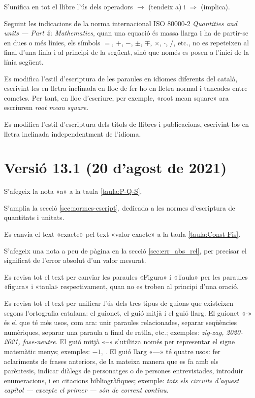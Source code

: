 S'unifica en tot el llibre l'ús dels operadors $\rightarrow$ (tendeix a) i $\Rightarrow$ (implica).

Seguint les indicacions de la norma internacional ISO 80000-2 \textit{Quantities and units --- Part 2: Mathematics}, quan una equació és massa llarga i ha de partir-se en dues o més línies, els símbols $=$, $+$, $-$, $\pm$, $\mp$, $\times$, $\cdot$, $/$, etc., no es repeteixen al final d'una línia i al principi de la següent, sinó que només es posen a l'inici de la  línia següent.

Es modifica l'estil d'escriptura de les paraules en idiomes diferents del català, escrivint-les en lletra inclinada en lloc de fer-ho en lletra normal i tancades entre cometes. Per tant, en lloc d'escriure, per exemple, «root mean square» ara escriurem \textit{root mean square}.

Es modifica l'estil d'escriptura dels títols de llibres i publicacions, escrivint-los en lletra inclinada independentment de l'idioma.


\section*{Versió 13.1 (20 d'agost de 2021)}

S'afegeix la nota «a» a la taula \ref{taula:P-Q-S}.

S'amplia la secció \ref{sec:normes-escript}, dedicada a les normes d'escriptura de quantitats i unitats.

Es canvia el text «exacte» pel text «valor exacte» a la taula \ref{taula:Const-Fis}.

S'afegeix una nota a peu de pàgina en la secció \ref{sec:err_abs_rel}, per precisar el significat de l'error absolut d'un valor mesurat.


Es revisa tot el text per canviar les paraules «Figura» i «Taula» per les paraules «figura» i «taula» respectivament, quan no es troben al principi d'una oració.

Es revisa tot el text per unificar l'ús dels tres tipus de guions que existeixen segons l'ortografia catalana: el guionet, el guió mitjà i el guió llarg. El guionet  «-» és el que té més usos, com ara:  unir paraules relacionades, separar seqüències numèriques, separar una paraula a final de ratlla, etc.; exemples: \textit{zig-zag, 2020-2021, fase-neutre}. El guió mitjà  «--» s'utilitza només per representar el signe matemàtic menys; exemples: $-1$, . El  guió llarg  «---» té quatre usos: fer aclariments de frases anteriors, de la mateixa manera que es fa amb els parèntesis, indicar diàlegs de personatges o de persones entrevistades, introduir enumeracions, i en citacions bibliogràfiques; exemple: \textit{tots els circuits d'aquest capítol --- excepte el primer --- són de corrent continu}.




